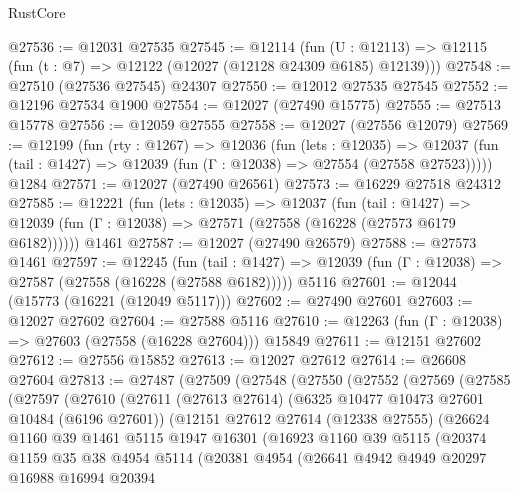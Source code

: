 \begin{lexlean}{RustCore}
\begin{coremodule}
@27536 := @12031 @27535
@27545 := @12114
    (fun (U : @12113) => @12115 (fun (t : @7) => @12122 (@12027 (@12128 @24309 @6185) @12139)))
@27548 := @27510 (@27536 @27545) @24307
@27550 := @12012 @27535 @27545
@27552 := @12196 @27534 @1900
@27554 := @12027 (@27490 @15775)
@27555 := @27513 @15778
@27556 := @12059 @27555
@27558 := @12027 (@27556 @12079)
@27569 := @12199
    (fun (rty : @1267) =>
    @12036
      (fun (lets : @12035) =>
      @12037 (fun (tail : @1427) => @12039 (fun (Γ : @12038) => @27554 (@27558 @27523)))))
    @1284
@27571 := @12027 (@27490 @26561)
@27573 := @16229 @27518 @24312
@27585 := @12221
    (fun (lets : @12035) =>
    @12037
      (fun (tail : @1427) =>
      @12039 (fun (Γ : @12038) => @27571 (@27558 (@16228 (@27573 @6179 @6182))))))
    @1461
@27587 := @12027 (@27490 @26579)
@27588 := @27573 @1461
@27597 := @12245
    (fun (tail : @1427) => @12039 (fun (Γ : @12038) => @27587 (@27558 (@16228 (@27588 @6182)))))
    @5116
@27601 := @12044 (@15773 (@16221 (@12049 @5117)))
@27602 := @27490 @27601
@27603 := @12027 @27602
@27604 := @27588 @5116
@27610 := @12263 (fun (Γ : @12038) => @27603 (@27558 (@16228 @27604))) @15849
@27611 := @12151 @27602
@27612 := @27556 @15852
@27613 := @12027 @27612
@27614 := @26608 @27604
@27813 := @27487
    (@27509
      (@27548
        (@27550
          (@27552
            (@27569
              (@27585
                (@27597
                  (@27610
                    (@27611
                      (@27613 @27614)
                      (@6325 @10477 @10473 @27601 @10484 (@6196 @27601))
                      (@12151
                        @27612
                        @27614
                        (@12338 @27555)
                        (@26624
                          @1160
                          @39
                          @1461
                          @5115
                          @1947
                          @16301
                          (@16923
                            @1160
                            @39
                            @5115
                            (@20374
                              @1159
                              @35
                              @38
                              @4954
                              @5114
                              (@20381
                                @4954
                                (@26641
                                  @4942
                                  @4949
                                  @20297
                                  @16988
                                  @16994
                                  @20394

\end{coremodule}
\end{lexlean}
